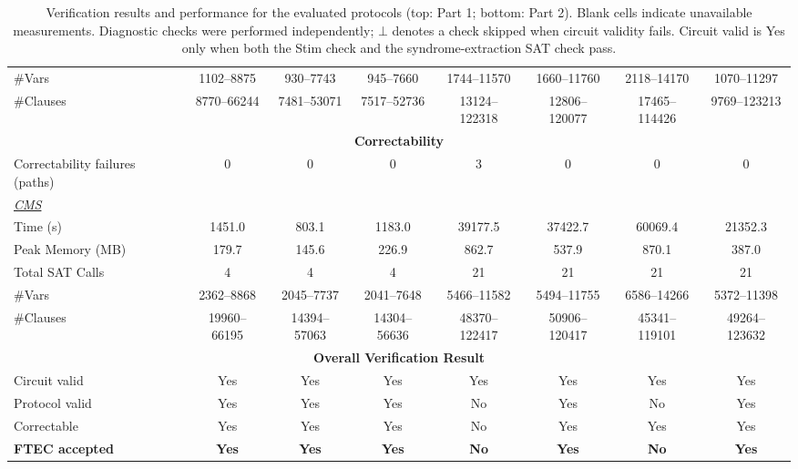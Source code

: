 \documentclass[acmsmall,screen,review,anonymous,nonacm]{acmart}
\begin{document}
\begin{table}[!tbp]
{\begin{tabular}{l ccccccc}
\#Vars & 1102--8875 & 930--7743 & 945--7660 & 1744--11570 & 1660--11760 & 2118--14170 & 1070--11297 \\
\#Clauses & 8770--66244 & 7481--53071 & 7517--52736 & 13124--122318 & 12806--120077 & 17465--114426 & 9769--123213 \\
\midrule
\multicolumn{8}{c}{\textbf{Correctability}} \\
\midrule
Correctability failures (paths) & 0 & 0 & 0 & 3 & 0 & 0 & 0 \\
\midrule
\multicolumn{8}{l}{\underline{\textit{CMS}}} \\
Time (s) & 1451.0 & 803.1 & 1183.0 & 39177.5 & 37422.7 & 60069.4 & 21352.3 \\
Peak Memory (MB) & 179.7 & 145.6 & 226.9 & 862.7 & 537.9 & 870.1 & 387.0 \\
Total SAT Calls & 4 & 4 & 4 & 21 & 21 & 21 & 21 \\
\#Vars & 2362--8868 & 2045--7737 & 2041--7648 & 5466--11582 & 5494--11755 & 6586--14266 & 5372--11398 \\
\#Clauses & 19960--66195 & 14394--57063 & 14304--56636 & 48370--122417 & 50906--120417 & 45341--119101 & 49264--123632 \\
\midrule
\multicolumn{8}{c}{\textbf{Overall Verification Result}} \\
\midrule
Circuit valid & Yes & Yes & Yes & Yes & Yes & Yes & Yes \\
Protocol valid & Yes & Yes & Yes & No & Yes & No & Yes \\
Correctable & Yes & Yes & Yes & No & Yes & Yes & Yes \\
\textbf{FTEC accepted} & \textbf{Yes} & \textbf{Yes} & \textbf{Yes} & \textbf{No} & \textbf{Yes} & \textbf{No} & \textbf{Yes} \\
\bottomrule
\end{tabular}%
}
\caption{Verification results and performance for the evaluated protocols (top: Part 1; bottom: Part 2). Blank cells indicate unavailable measurements. Diagnostic checks were performed independently; $\bot$ denotes a check skipped when circuit validity fails. Circuit valid is Yes only when both the Stim check and the syndrome-extraction SAT check pass.}
\label{tab:combined-results}
\endgroup
\end{table}
\end{document}
